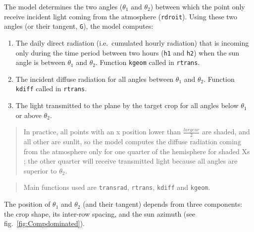 \documentclass[]{book}
\providecommand{\tightlist}{%
  \setlength{\itemsep}{0pt}\setlength{\parskip}{0pt}}
\begin{document}
The model determines the two angles (\(\theta_1\) and \(\theta_2\)) between which the point only receive incident light coming from the atmosphere (\texttt{rdroit}). Using these two angles (or their tangent, \texttt{G}), the model computes:

\begin{enumerate}
\def\labelenumi{\arabic{enumi}.}
\tightlist
\item
  The daily direct radiation (i.e.~cumulated hourly radiation) that is incoming only during the time period between two hours (\texttt{h1} and \texttt{h2}) when the sun angle is between \(\theta_1\) and \(\theta_2\). Function \texttt{kgeom} called in \texttt{rtrans}.
\item
  The incident diffuse radiation for all angles between \(\theta_1\) and \(\theta_2\). Function \texttt{kdiff} called in \texttt{rtrans}.
\item
  The light transmitted to the plane by the target crop for all angles below \(\theta_1\) or above \(\theta_2\).
\end{enumerate}

\begin{quote}
In practice, all points with an x position lower than \(\frac{largeur}{2}\) are shaded, and all other are sunlit, so the model computes the diffuse radiation coming from the atmosphere only for one quarter of the hemisphere for shaded Xs ; the other quarter will receive transmitted light because all angles are superior to \(\theta_2\).
\end{quote}

\begin{quote}
Main functions used are \texttt{transrad}, \texttt{rtrans}, \texttt{kdiff} and \texttt{kgeom}.
\end{quote}

The position of \(\theta_1\) and \(\theta_2\) (and their tangent) depends from three components: the crop shape, its inter-row spacing, and the sun azimuth (see fig.~\ref{fig:Compdominated}).
\end{document}
